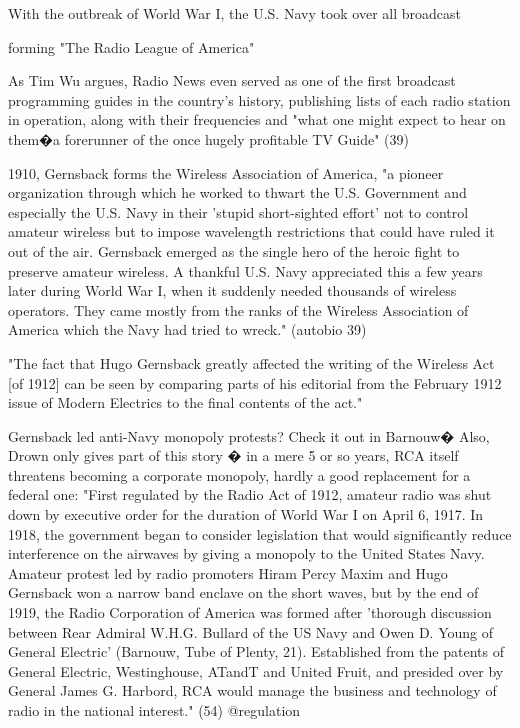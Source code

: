 \documentclass{article}
\begin{document}
With the outbreak of World War I, the U.S. Navy took over all broadcast 

forming "The Radio League of America"

As Tim Wu argues, Radio News even served as one of the first broadcast programming guides in the country's history, publishing lists of each radio station in operation, along with their frequencies and "what one might expect to hear on them�a forerunner of the once hugely profitable TV Guide" (39)

1910, Gernsback forms the Wireless Association of America, "a pioneer organization through which he worked to thwart the U.S. Government and especially the U.S. Navy in their 'stupid short-sighted effort' not to control amateur wireless but to impose wavelength restrictions that could have ruled it out of the air.  Gernsback emerged as the single hero of the heroic fight to preserve amateur wireless.  A thankful U.S. Navy appreciated this a few years later during World War I, when it suddenly needed thousands of wireless operators.  They came mostly from the ranks of the Wireless Association of America which the Navy had tried to wreck."  (autobio 39)

"The fact that Hugo Gernsback greatly affected the writing of the Wireless Act [of 1912] can be seen by comparing parts of his editorial from the February 1912 issue of Modern Electrics to the final contents of the act."

Gernsback led anti-Navy monopoly protests?  Check it out in Barnouw�  Also, Drown only gives part of this story � in a mere 5 or so years, RCA itself threatens becoming a corporate monopoly, hardly a good replacement for a federal one:  "First regulated by the Radio Act of 1912, amateur radio was shut down by executive order for the duration of World War I on April 6, 1917.  In 1918, the government began to consider legislation that would significantly reduce interference on the airwaves by giving a monopoly to the United States Navy.  Amateur protest led by radio promoters Hiram Percy Maxim and Hugo Gernsback won a narrow band enclave on the short waves, but by the end of 1919, the Radio Corporation of America was formed after 'thorough discussion between Rear Admiral W.H.G. Bullard of the US Navy and Owen D. Young of General Electric' (Barnouw, Tube of Plenty, 21).  Established from the patents of General Electric, Westinghouse, ATandT and United Fruit, and presided over by General James G. Harbord, RCA would manage the business and technology of radio in the national interest." (54) @regulation
\end{document}
